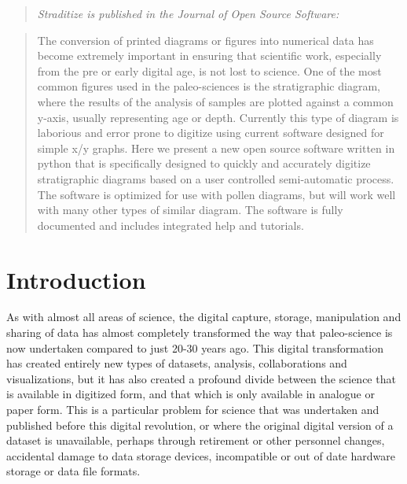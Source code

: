 

\label{chp:straditize}

\newcommand{\samplediagram}[1][false]{
	\ref{fig:sample-diagram}\hyperref[fig:sample-diagram]{
		\ifthenelse{\equal{#1}{false}}{}{#1)}}}


\begin{refsection}
	
	\blockquote{
		\textit{\emph{Straditize} is published in the Journal of Open Source Software:}
	}

\setcounter{secnumdepth}{3}
	
\begin{abstract}
	The conversion of printed diagrams or figures into numerical data has become extremely important in ensuring that scientific work, especially from the pre or early digital age, is not lost to science. One of the most common figures used in the paleo-sciences is the stratigraphic diagram, where the results of the analysis of samples are plotted against a common y-axis, usually representing age or depth. Currently this type of diagram is laborious and error prone to digitize using current software designed for simple x/y graphs. Here we present a new open source software written in python that is specifically designed to quickly and accurately digitize stratigraphic diagrams based on a user controlled semi-automatic process. The software is optimized for use with pollen diagrams, but will work well with many other types of similar diagram. The software is fully documented and includes integrated help and tutorials. 
\end{abstract}

\section{Introduction}   \label{sec:straditize-intro}

As with almost all areas of science, the digital capture, storage, manipulation and sharing of data has almost completely transformed the way that paleo-science is now undertaken compared to just 20-30 years ago. This digital transformation has created entirely new types of datasets, analysis, collaborations and visualizations, but it has also created a profound divide between the science that is available in digitized form, and that which is only available in analogue or paper form. This is a particular problem for science that was undertaken and published before this digital revolution, or where the original digital version of a dataset is unavailable, perhaps through retirement or other personnel changes, accidental damage to data storage devices, incompatible or out of date hardware storage or data file formats. 


\end{refsection}
